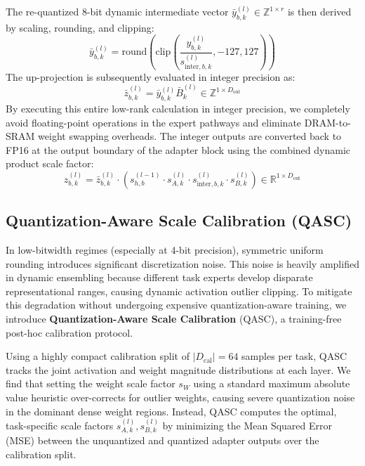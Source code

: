 The re-quantized 8-bit dynamic intermediate vector $\bar{y}_{b, k}^{(l)} \in \mathbb{Z}^{1 \times r}$ is then derived by scaling, rounding, and clipping:
\begin{equation}
  \bar{y}_{b, k}^{(l)} = \text{round}\left( \text{clip}\left( \frac{y_{b, k}^{(l)}}{s_{\text{inter}, b, k}^{(l)}}, -127, 127 \right) \right)
\end{equation}
The up-projection is subsequently evaluated in integer precision as:
\begin{equation}
  \bar{z}_{b, k}^{(l)} = \bar{y}_{b, k}^{(l)} \bar{B}_k^{(l)} \in \mathbb{Z}^{1 \times D_{\text{out}}}
\end{equation}
By executing this entire low-rank calculation in integer precision, we completely avoid floating-point operations in the expert pathways and eliminate DRAM-to-SRAM weight swapping overheads. The integer outputs are converted back to FP16 at the output boundary of the adapter block using the combined dynamic product scale factor:
\begin{equation}
  z_{b, k}^{(l)} = \bar{z}_{b, k}^{(l)} \cdot \left( s_{h, b}^{(l-1)} \cdot s_{A, k}^{(l)} \cdot s_{\text{inter}, b, k}^{(l)} \cdot s_{B, k}^{(l)} \right) \in \mathbb{R}^{1 \times D_{\text{out}}}
\end{equation}

\subsection{Quantization-Aware Scale Calibration (QASC)}
In low-bitwidth regimes (especially at 4-bit precision), symmetric uniform rounding introduces significant discretization noise. This noise is heavily amplified in dynamic ensembling because different task experts develop disparate representational ranges, causing dynamic activation outlier clipping. To mitigate this degradation without undergoing expensive quantization-aware training, we introduce \textbf{Quantization-Aware Scale Calibration} (QASC), a training-free post-hoc calibration protocol.

Using a highly compact calibration split of $|D_{\text{cal}}| = 64$ samples per task, QASC tracks the joint activation and weight magnitude distributions at each layer. We find that setting the weight scale factor $s_{W}$ using a standard maximum absolute value heuristic over-corrects for outlier weights, causing severe quantization noise in the dominant dense weight regions. Instead, QASC computes the optimal, task-specific scale factors $s_{A, k}^{(l)}, s_{B, k}^{(l)}$ by minimizing the Mean Squared Error (MSE) between the unquantized and quantized adapter outputs over the calibration split.

